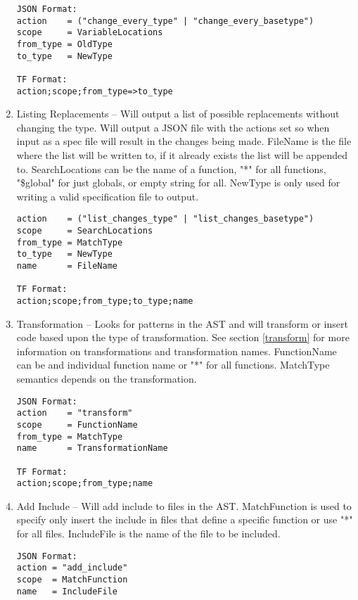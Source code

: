 \documentclass[natbib]{article}
\begin{document}
\begin{enumerate}
\begin{verbatim}
JSON Format:
action    = ("change_every_type" | "change_every_basetype")
scope     = VariableLocations
from_type = OldType
to_type   = NewType

TF Format:
action;scope;from_type=>to_type
\end{verbatim}

\item{} Listing Replacements -- Will output a list of possible replacements without 
changing the type. Will output a JSON file with the actions set so when input as a 
spec file will result in the changes being made. FileName is the file where the list will be 
written to, if it already exists the list will be appended to. SearchLocations can be the name 
of a function, "*" for all functions, "\$global" for just globals, or empty string for all. 
NewType is only used for writing a valid specification file to output.

\begin{verbatim}
action    = ("list_changes_type" | "list_changes_basetype")
scope     = SearchLocations
from_type = MatchType
to_type   = NewType
name      = FileName

TF Format:
action;scope;from_type;to_type;name
\end{verbatim}

\item{} Transformation -- Looks for patterns in the AST and will transform or insert 
code based upon the type of transformation. See section \ref{transform} for more 
information on transformations and transformation names. FunctionName can be and 
individual function name or "*" for all functions. MatchType semantics depends on 
the transformation.

\begin{verbatim}
JSON Format:
action    = "transform"
scope     = FunctionName 
from_type = MatchType
name      = TransformationName

TF Format:
action;scope;from_type;name
\end{verbatim}

\item{} Add Include -- Will add include to files in the AST. MatchFunction is used to specify 
only insert the include in files that define a specific function or use "*" for all files. 
IncludeFile is the name of the file to be included.

\begin{verbatim}
JSON Format:
action = "add_include"
scope  = MatchFunction
name   = IncludeFile


\end{verbatim}
\end{enumerate}
\end{document}
